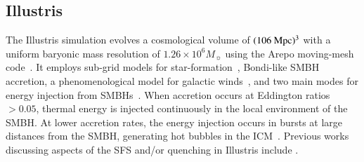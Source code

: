 \documentclass[tighten, preprint]{aastex62}
\begin{document}



\subsection{Illustris}
The Illustris simulation \citep{vogelsberger2014,genel2014} evolves a
cosmological volume of $(106\ \rm{Mpc})^3$ with a uniform baryonic mass
resolution of $1.26\times10^6M_{\sun}$ using the {\sc Arepo} moving-mesh 
code~\citep{springel2010}. 
It employs sub-grid models for star-formation~\citep{springel2003},
Bondi-like SMBH accretion, a phenomenological model for galactic 
winds~\citep{oppenheimer2006}, and two main modes for energy injection 
from SMBHs~\citep[see][]{vogelsberger2013}. When accretion occurs 
at Eddington ratios $>0.05$, thermal energy is injected continuously in 
the local environment of the SMBH. At lower accretion rates, the 
energy injection occurs in bursts at large distances from the SMBH, generating hot bubbles in the ICM~\citep{sijacki2007}.
Previous works discussing aspects of the SFS and/or quenching in Illustris 
include \citet{genel2014, vogelsberger2014, sparre2015, bluck2016, terrazas2017}.
\end{document}
